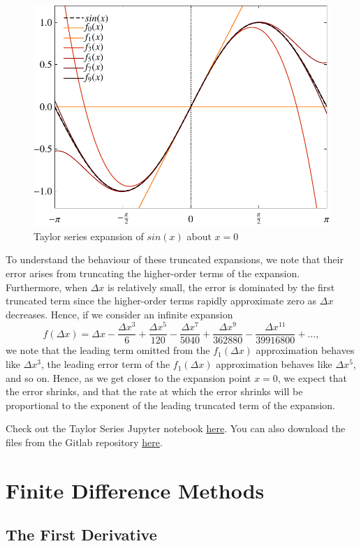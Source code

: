 \begin{figure}[htbp]
	\centering
	\includegraphics[width=0.6\linewidth]{Pictures/taylor_series_sin}
	\caption{Taylor series expansion of $sin(x)$ about $x=0$}
	\label{fig:taylor_series}
\end{figure}

To understand the behaviour of these truncated expansions, we note that their error arises from truncating the higher-order terms of the expansion. Furthermore, when $\Delta x$ is relatively small, the error is dominated by the first truncated term since the higher-order terms rapidly approximate zero as $\Delta x$ decreases. Hence, if we consider an infinite expansion
\begin{equation}
	f(\Delta x) = \Delta x - \frac{\Delta x^3}{6} + \frac{\Delta x^5}{120} - \frac{\Delta x^7}{5040} + \frac{\Delta x^9}{362880} - \frac{\Delta x^{11}}{39916800} + \hdots,
\end{equation}
we note that the leading term omitted from the $f_1(\Delta x)$ approximation behaves like $\Delta x^3$, the leading error term of the $f_1(\Delta x)$ approximation behaves like $\Delta x^5$, and so on. Hence, as we get closer to the expansion point $x=0$, we expect that the error shrinks, and that the rate at which the error shrinks will be proportional to the exponent of the leading truncated term of the expansion.
\begin{jupyternote}
	Check out the Taylor Series Jupyter notebook \href{\binderurl}{\underline{here}}. You can also download the files from the Gitlab repository \href{\repourl}{\underline{here}}.
\end{jupyternote}
\chapter{Finite Difference Methods}
\section{The First Derivative}

